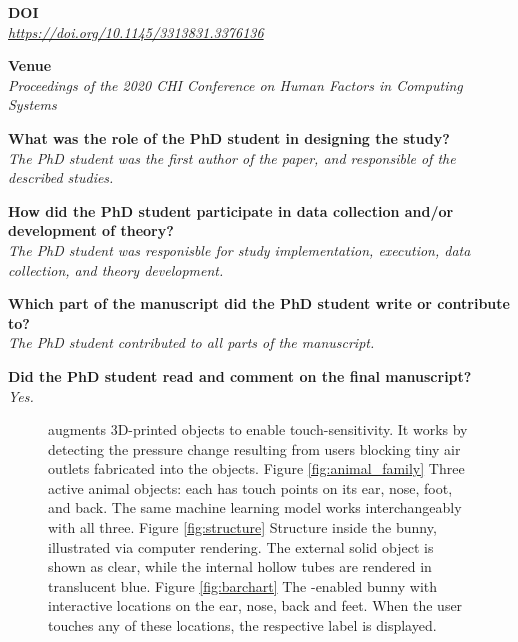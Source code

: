 	\bigskip

	\noindent
	\textbf{DOI}\\
	\textit{\href{https://doi.org/10.1145/3313831.3376136}{https://doi.org/10.1145/3313831.3376136}}

	\bigskip

	\noindent
  \textbf{Venue}\\
  \textit{Proceedings of the 2020 CHI Conference on Human Factors in Computing Systems}

	\bigskip

	\noindent
	\textbf{What was the role of the PhD student in designing the study?}\\
  \textit{The PhD student was the first author of the paper, and responsible
    of the described studies.}

	\bigskip

	\noindent
	\textbf{How did the PhD student participate in data collection and/or development of theory?}\\
  \textit{The PhD student was responisble for study implementation, execution,
    data collection, and theory development.}

	\bigskip

	\noindent
	\textbf{Which part of the manuscript did the PhD student write or contribute to?}\\
  \textit{The PhD student contributed to all parts of the manuscript.}

	\bigskip

	\noindent
	\textbf{Did the PhD student read and comment on the final manuscript?}\\
	\textit{Yes.}

	\bigskip
	\vfill

	\newpage

  \begin{figure}
    \centering

    \caption{\at augments 3D-printed objects to enable touch-sensitivity. It
    works by detecting the pressure change resulting from users blocking tiny
    air outlets fabricated into the objects. Figure \ref{fig:animal_family}
    Three active animal objects: each has touch points on its ear, nose, foot,
    and back. The same machine learning model works interchangeably with all
    three. Figure \ref{fig:structure} Structure inside the bunny, illustrated
    via computer rendering. The external solid object is shown as clear, while
    the internal hollow tubes are rendered in translucent blue.  Figure
    \ref{fig:barchart} The \at-enabled bunny with interactive locations on the
    ear, nose, back and feet. When the user touches any of these locations, the
    respective label is displayed.}

    \label{fig:teaser}%
  \end{figure}

